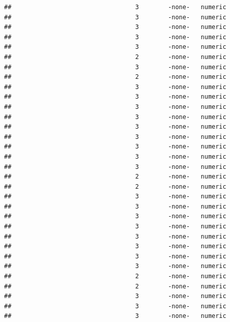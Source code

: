 \documentclass[
  12pt,
]{article}
\begin{document}
\begin{verbatim}
##                                  3        -none-   numeric                    
##                                  3        -none-   numeric                    
##                                  3        -none-   numeric                    
##                                  3        -none-   numeric                    
##                                  3        -none-   numeric                    
##                                  2        -none-   numeric                    
##                                  3        -none-   numeric                    
##                                  2        -none-   numeric                    
##                                  3        -none-   numeric                    
##                                  3        -none-   numeric                    
##                                  3        -none-   numeric                    
##                                  3        -none-   numeric                    
##                                  3        -none-   numeric                    
##                                  3        -none-   numeric                    
##                                  3        -none-   numeric                    
##                                  3        -none-   numeric                    
##                                  3        -none-   numeric                    
##                                  2        -none-   numeric                    
##                                  2        -none-   numeric                    
##                                  3        -none-   numeric                    
##                                  3        -none-   numeric                    
##                                  3        -none-   numeric                    
##                                  3        -none-   numeric                    
##                                  3        -none-   numeric                    
##                                  3        -none-   numeric                    
##                                  3        -none-   numeric                    
##                                  3        -none-   numeric                    
##                                  2        -none-   numeric                    
##                                  2        -none-   numeric                    
##                                  3        -none-   numeric                    
##                                  3        -none-   numeric                    
##                                  3        -none-   numeric                    

\end{verbatim}
\end{document}
